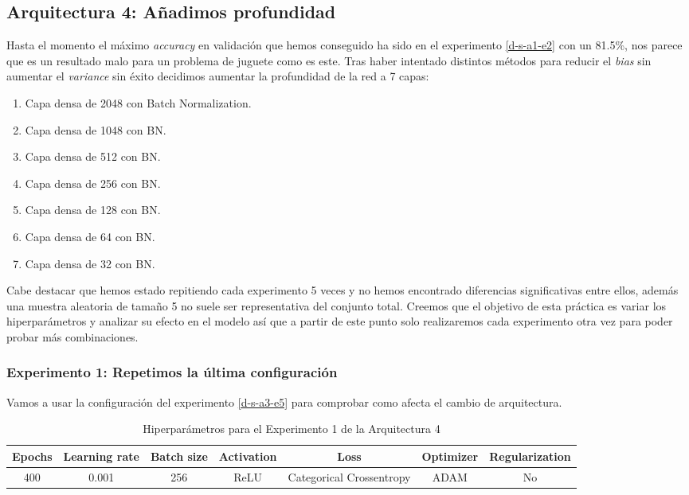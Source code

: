 \documentclass{article}
\begin{document}
	\subsection{Arquitectura 4: A\~nadimos profundidad}
	\label{d-s-a4}
		Hasta el momento el m\'aximo \textit{accuracy} en validaci\'on que hemos conseguido ha sido en el experimento \ref{d-s-a1-e2} con un 81.5\%, nos parece que es un resultado malo para un problema de juguete como es este. Tras haber intentado distintos m\'etodos para reducir el \textit{bias} sin aumentar el \textit{variance} sin \'exito decidimos aumentar la profundidad de la red a 7 capas:
		\begin{enumerate}
			\item Capa densa de 2048 con Batch Normalization.
			\item Capa densa de 1048 con BN.
			\item Capa densa de 512 con BN.
			\item Capa densa de 256 con BN.
			\item Capa densa de 128 con BN.
			\item Capa densa de 64 con BN.
			\item Capa densa de 32 con BN.
		\end{enumerate}
		
		Cabe destacar que hemos estado repitiendo cada experimento 5 veces y no hemos encontrado diferencias significativas entre ellos, adem\'as una muestra aleatoria de tama\~no 5 no suele ser representativa del conjunto total. Creemos que el objetivo de esta pr\'actica es variar los hiperpar\'ametros y analizar su efecto en el modelo as\'i que a partir de este punto solo realizaremos cada experimento otra vez para poder probar m\'as combinaciones.
		\newpage
		
		\subsubsection{Experimento 1: Repetimos la \'ultima configuraci\'on}
		\label{d-s-a4-e1}
			Vamos a usar la configuraci\'on del experimento \ref{d-s-a3-e5} para comprobar como afecta el cambio de arquitectura.
			\begin{table}[!h]
				\begin{tabular}{| c | c | c | c | c | c | c |}
					\textbf{Epochs} & \textbf{Learning rate} & \textbf{Batch size} & \textbf{Activation} & \textbf{Loss} & \textbf{Optimizer} & \textbf{Regularization} \\ \hline
					400 & 0.001 & 256 & ReLU & Categorical Crossentropy & ADAM & No
				\end{tabular}
				\caption{Hiperpar\'ametros para el Experimento 1 de la Arquitectura 4}
				\label{tab:hip-d-a4-e1}
			\end{table}
			
\end{document}

